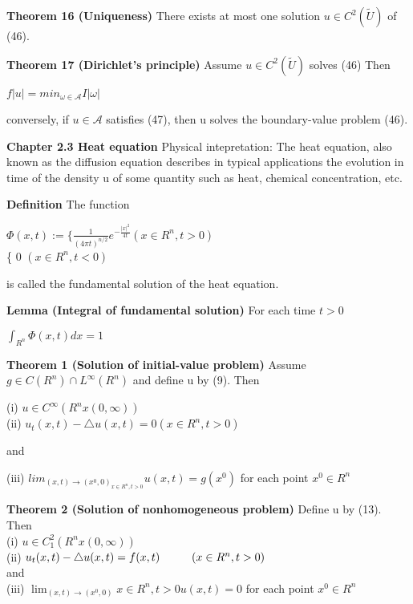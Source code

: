 \documentclass{article}
\newcommand\tab[1][1cm]{\hspace*{#1}}
\begin{document}
\textbf {Theorem 16 (Uniqueness)} There exists at most one solution $u \in C^2(\tilde{U})$ of (46).

\textbf {Theorem 17 (Dirichlet's principle)} Assume $u \in C^2(\tilde{U})$ solves (46) Then
\begin{center}
$f|u| = min_{\omega \in \mathscr{A}} I |\omega|$
\end{center}
conversely, if $u \in \mathscr{A}$ satisfies (47), then u solves the boundary-value problem (46).

\textbf {Chapter 2.3 Heat equation} Physical intepretation: The heat equation, also known as the diffusion equation describes in typical applications the evolution in time of the density u of some quantity such as heat, chemical concentration, etc.

\textbf {Definition} The function
\begin{center}
$\Phi(x,t) := \{ \frac{1}{(4 \pi t)^{n/2}} e^{-\frac{|x|^2}{4t}} (x \in R^n, t > 0)$ \\
\tab \{ 0 \tab $(x \in R^n, t < 0)$
\end{center}
is called the fundamental solution of the heat equation.

\textbf {Lemma (Integral of fundamental solution)} For each time $t > 0$
\begin{center}
$\int_{R^n} \Phi(x,t) dx = 1$ 
\end{center}

\textbf {Theorem 1 (Solution of initial-value problem)} Assume $g \in C(R^n) \cap L^{\infty}(R^n)$ and define u by (9). Then
\begin{center}
(i) $u \in C^{\infty} (R^n x (0, \infty))$ \\
(ii) $u_t(x,t) - \triangle u (x,t) = 0 (x \in R^n, t > 0)$
\end{center}
and 
\begin{center}
(iii) $lim_{{(x,t) \to (x^0, 0)}_{x \in R^n, t > 0}} u(x,t) = g(x^0)$ for each point $x^0 \in R^n$
\end{center}

\textbf {Theorem 2 (Solution of nonhomogeneous problem)} Define u by (13). Then \\
(i) \tab $u \in C^2_1 (R^n x (0, \infty))$ \\
(ii) \tab $u_t(x,t) - \triangle u(x,t) = f(x,t) \tab (x \in R^n, t>0)$ \\
and \\
(iii) $\lim_{(x,t) \to (x^0, 0)}{x \in R^n, t >0} u(x,t) = 0$ for each point $x^0 \in R^n$
\end{document}
